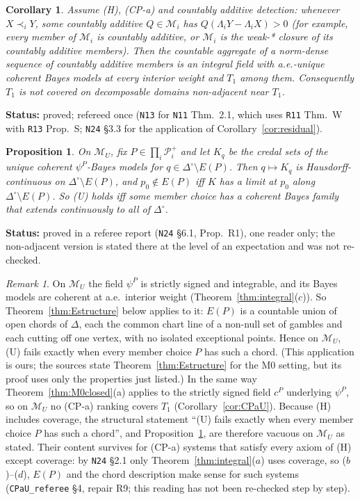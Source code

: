 \documentclass[11pt]{article}
\newtheorem{proposition}[theorem]{Proposition}
\newtheorem{corollary}[theorem]{Corollary}
\theoremstyle{definition}
\theoremstyle{remark}
\newtheorem{remark}[theorem]{Remark}
\newcommand{\Di}{\Delta^{\circ}}
\newcommand{\M}{\mathcal M}
\newcommand{\src}[1]{\texttt{#1}}
\newcommand{\status}[1]{\par\smallskip\noindent\textbf{Status:} #1\par\smallskip}
\begin{document}
\begin{corollary}\label{cor:DCA}
Assume (H), (CP-a) and countably additive detection: whenever $X\prec_iY$, some countably additive $Q\in\M_i$ has $Q(\Lambda_iY-\Lambda_iX)>0$ (for example, every member of $\M_i$ is countably additive, or $\M_i$ is the weak-* closure of its countably additive members). Then the countable aggregate of a norm-dense sequence of countably additive members is an integral field with a.e.-unique coherent Bayes models at every interior weight and $T_1$ among them. Consequently $T_1$ is not covered on decomposable domains non-adjacent near $T_1$.
\end{corollary}
\status{proved; refereed once (\src{N13} for \src{N11} Thm.~2.1, which uses \src{R11} Thm.~W with \src{R13} Prop.~S; \src{N24} \S3.3 for the application of Corollary~\ref{cor:residual}).}

\begin{proposition}\label{prop:Ucont}
On $\M_U$, fix $P\in\prod_i\mathcal P^+_i$ and let $K_q$ be the credal sets of the unique coherent $\psi^P$-Bayes models for $q\in\Di\setminus E(P)$. Then $q\mapsto K_q$ is Hausdorff-continuous on $\Di\setminus E(P)$, and $p_0\notin E(P)$ iff $K$ has a limit at $p_0$ along $\Di\setminus E(P)$. So (U) holds iff some member choice has a coherent Bayes family that extends continuously to all of $\Di$.
\end{proposition}
\status{proved in a referee report (\src{N24} \S6.1, Prop.~R1), one reader only; the non-adjacent version is stated there at the level of an expectation and was not re-checked.}

\begin{remark}\label{rem:EPchords}
On $\M_U$ the field $\psi^P$ is strictly signed and integrable, and its Bayes models are coherent at a.e.\ interior weight (Theorem~\ref{thm:integral}($c$)). So Theorem~\ref{thm:Estructure} below applies to it: $E(P)$ is a countable union of open chords of $\Delta$, each the common chart line of a non-null set of gambles and each cutting off one vertex, with no isolated exceptional points. Hence on $\M_U$, (U) fails exactly when every member choice $P$ has such a chord. (This application is ours; the sources state Theorem~\ref{thm:Estructure} for the M0 setting, but its proof uses only the properties just listed.) In the same way Theorem~\ref{thm:M0closed}(a) applies to the strictly signed field $c^P$ underlying $\psi^P$, so on $\M_U$ no (CP-a) ranking covers $T_1$ (Corollary~\ref{cor:CPaU}). Because (H) includes coverage, the structural statement ``(U) fails exactly when every member choice $P$ has such a chord'', and Proposition~\ref{prop:Ucont}, are therefore vacuous on $\M_U$ as stated. Their content survives for (CP-a) systems that satisfy every axiom of (H) except coverage: by \src{N24} \S2.1 only Theorem~\ref{thm:integral}($a$) uses coverage, so ($b$)--($d$), $E(P)$ and the chord description make sense for such systems (\src{CPaU\_referee} \S4, repair R9; this reading has not been re-checked step by step).
\end{remark}
\end{document}
